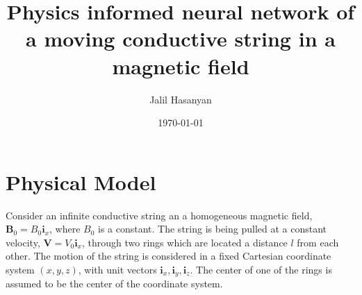 \documentclass{article}
\title{Physics informed neural network of a moving conductive string in a magnetic field}
\author{Jalil Hasanyan}
\date{\today}
\begin{document}
\maketitle

\section{Physical Model}
Consider an infinite conductive string an a homogeneous magnetic field, $\textbf{B}_0 = B_0 \textbf{i}_x$, where $B_0$ is a constant. The string is being pulled at a constant velocity, $\textbf{V} = V_0 \textbf{i}_x$, through two rings which are located a distance $l$ from each other. The motion of the string is considered in a fixed Cartesian coordinate system $(x,y,z)$, with unit vectors $\textbf{i}_x, \textbf{i}_y, \textbf{i}_z$. The center of one of the rings is assumed to be the center of the coordinate system.


\end{document}
